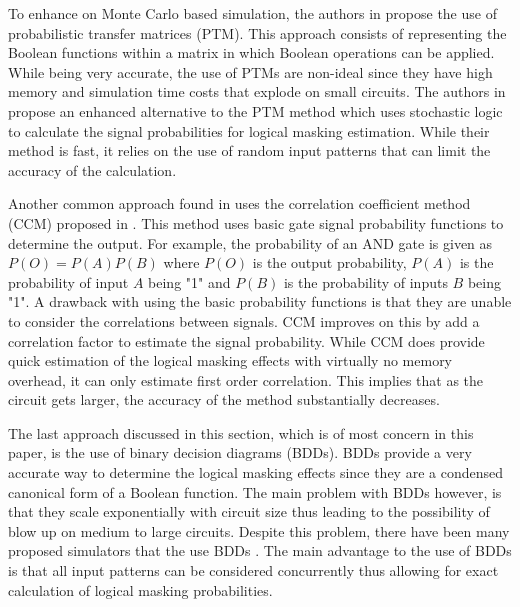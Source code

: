 To enhance on Monte Carlo based simulation, the authors in \cite{PTM} propose the use of probabilistic transfer matrices (PTM). This approach consists of representing the Boolean functions within a matrix in which Boolean operations can be applied. While being very accurate, the use of PTMs are non-ideal since they have high memory and simulation time costs that explode on small circuits. The authors in \cite{Han2014} propose an enhanced alternative to the PTM method which uses stochastic logic to calculate the signal probabilities for logical masking estimation. While their method is fast, it relies on the use of random input patterns that can limit the accuracy of the calculation.

Another common approach found in \cite{Chen2013,Li2016} uses the correlation coefficient method (CCM) proposed in \cite{Ercolani1989}. This method uses basic gate signal probability functions to determine the output. For example, the probability of an AND gate is given as $P(O) = P(A)P(B)$ where $P(O)$ is the output probability, $P(A)$ is the probability of input $A$ being "1" and $P(B)$ is the probability of inputs $B$ being "1". A drawback with using the basic probability functions is that they are unable to consider the correlations between signals. CCM improves on this by add a correlation factor to estimate the signal probability. While CCM does provide quick estimation of the logical masking effects with virtually no memory overhead, it can only estimate first order correlation. This implies that as the circuit gets larger, the accuracy of the method substantially decreases.

The last approach discussed in this section, which is of most concern in this paper, is the use of binary decision diagrams (BDDs). BDDs provide a very accurate way to determine the logical masking effects since they are a condensed canonical form of a Boolean function. The main problem with BDDs however, is that they scale exponentially with circuit size thus leading to the possibility of blow up on medium to large circuits. Despite this problem, there have been many proposed simulators that the use BDDs \cite{FASER,MARS_C,METSys}. The main advantage to the use of BDDs is that all input patterns can be considered concurrently thus allowing for exact calculation of logical masking probabilities.

